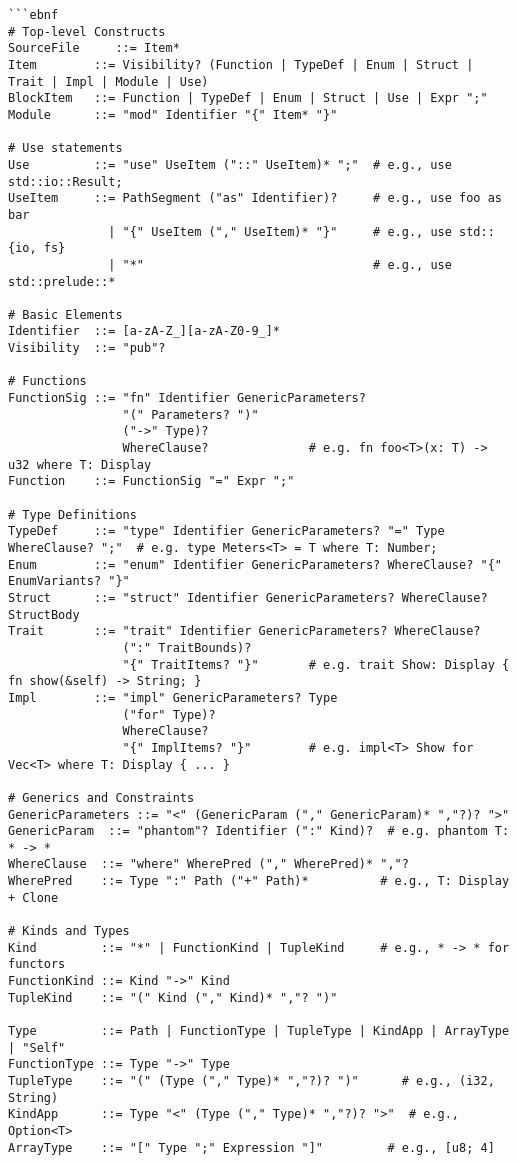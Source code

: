 \begin{verbatim}
```ebnf
# Top-level Constructs
SourceFile     ::= Item*
Item        ::= Visibility? (Function | TypeDef | Enum | Struct | Trait | Impl | Module | Use)
BlockItem   ::= Function | TypeDef | Enum | Struct | Use | Expr ";"
Module      ::= "mod" Identifier "{" Item* "}"

# Use statements
Use         ::= "use" UseItem ("::" UseItem)* ";"  # e.g., use std::io::Result;
UseItem     ::= PathSegment ("as" Identifier)?     # e.g., use foo as bar
              | "{" UseItem ("," UseItem)* "}"     # e.g., use std::{io, fs}
              | "*"                                # e.g., use std::prelude::*

# Basic Elements
Identifier  ::= [a-zA-Z_][a-zA-Z0-9_]*
Visibility  ::= "pub"?

# Functions
FunctionSig ::= "fn" Identifier GenericParameters? 
                "(" Parameters? ")" 
                ("->" Type)? 
                WhereClause?              # e.g. fn foo<T>(x: T) -> u32 where T: Display
Function    ::= FunctionSig "=" Expr ";"

# Type Definitions
TypeDef     ::= "type" Identifier GenericParameters? "=" Type WhereClause? ";"  # e.g. type Meters<T> = T where T: Number;
Enum        ::= "enum" Identifier GenericParameters? WhereClause? "{" EnumVariants? "}"
Struct      ::= "struct" Identifier GenericParameters? WhereClause? StructBody
Trait       ::= "trait" Identifier GenericParameters? WhereClause? 
                (":" TraitBounds)? 
                "{" TraitItems? "}"       # e.g. trait Show: Display { fn show(&self) -> String; }
Impl        ::= "impl" GenericParameters? Type 
                ("for" Type)? 
                WhereClause? 
                "{" ImplItems? "}"        # e.g. impl<T> Show for Vec<T> where T: Display { ... }

# Generics and Constraints
GenericParameters ::= "<" (GenericParam ("," GenericParam)* ","?)? ">"
GenericParam  ::= "phantom"? Identifier (":" Kind)?  # e.g. phantom T: * -> *
WhereClause  ::= "where" WherePred ("," WherePred)* ","?
WherePred    ::= Type ":" Path ("+" Path)*          # e.g., T: Display + Clone

# Kinds and Types
Kind         ::= "*" | FunctionKind | TupleKind     # e.g., * -> * for functors
FunctionKind ::= Kind "->" Kind
TupleKind    ::= "(" Kind ("," Kind)* ","? ")"

Type         ::= Path | FunctionType | TupleType | KindApp | ArrayType | "Self"
FunctionType ::= Type "->" Type
TupleType    ::= "(" (Type ("," Type)* ","?)? ")"      # e.g., (i32, String)
KindApp      ::= Type "<" (Type ("," Type)* ","?)? ">"  # e.g., Option<T>
ArrayType    ::= "[" Type ";" Expression "]"         # e.g., [u8; 4]


\end{verbatim}
